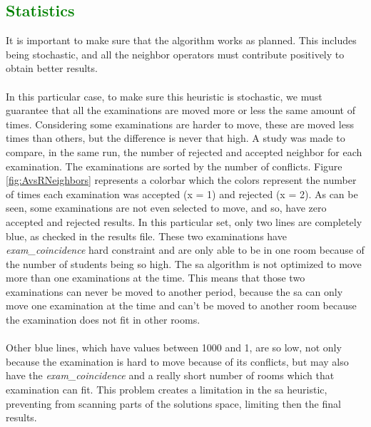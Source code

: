 \subsection{\textcolor{green}{Statistics}}
\label{sub:SAStatistics}
It is important to make sure that the algorithm works as planned. This includes being stochastic, and all the neighbor operators must contribute positively to obtain better results.\\
\\
In this particular case, to make sure this heuristic is stochastic, we must guarantee that all the examinations are moved more or less the same amount of times. Considering some examinations are harder to move, these are moved less times than others, but the difference is never that high. A study was made to compare, in the same run, the number of rejected and accepted neighbor for each examination. The examinations are sorted by the number of conflicts. Figure \ref{fig:AvsRNeighbors} represents a colorbar which the colors represent the number of times each examination was accepted (x = 1) and rejected (x = 2). As can be seen, some examinations are not even selected to move, and so, have zero accepted and rejected results. In this particular set, only two lines are completely blue, as checked in the results file. These two examinations have \textit{exam\_coincidence} hard constraint and are only able to be in one room because of the number of students being so high. The \gls{sa} algorithm is not optimized to move more than one examinations at the time. This means that those two examinations can never be moved to another period, because the \gls{sa} can only move one examination at the time and can't be moved to another room because the examination does not fit in other rooms.\\
\\
Other blue lines, which have values between 1000 and 1, are so low, not only because the examination is hard to move because of its conflicts, but may also have the \textit{exam\_coincidence} and a really short number of rooms which that examination can fit. This problem creates a limitation in the \gls{sa} heuristic, preventing from scanning parts of the solutions space, limiting then the final results.\\
\\
